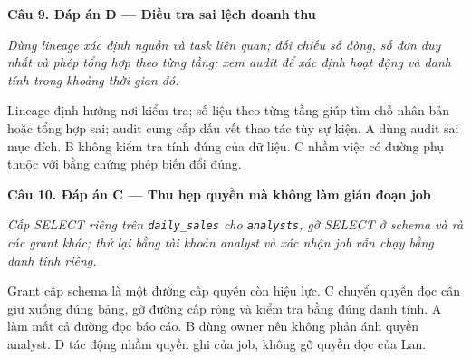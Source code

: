 \noindent\textbf{Câu 9. Đáp án D --- Điều tra sai lệch doanh thu}\par
\noindent\emph{Dùng lineage xác định nguồn và task liên quan; đối chiếu số dòng, số đơn duy nhất và phép tổng hợp theo từng tầng; xem audit để xác định hoạt động và danh tính trong khoảng thời gian đó.}\par
Lineage định hướng nơi kiểm tra; số liệu theo từng tầng giúp tìm chỗ nhân bản hoặc tổng hợp sai; audit cung cấp dấu vết thao tác tùy sự kiện. A dùng audit sai mục đích. B không kiểm tra tính đúng của dữ liệu. C nhầm việc có đường phụ thuộc với bằng chứng phép biến đổi đúng.\par\addvspace{0.8em}

\noindent\textbf{Câu 10. Đáp án C --- Thu hẹp quyền mà không làm gián đoạn job}\par
\noindent\emph{Cấp SELECT riêng trên \texttt{daily\_sales} cho \texttt{analysts}, gỡ SELECT ở schema và rà các grant khác; thử lại bằng tài khoản analyst và xác nhận job vẫn chạy bằng danh tính riêng.}\par
Grant cấp schema là một đường cấp quyền còn hiệu lực. C chuyển quyền đọc cần giữ xuống đúng bảng, gỡ đường cấp rộng và kiểm tra bằng đúng danh tính. A làm mất cả đường đọc báo cáo. B dùng owner nên không phản ánh quyền analyst. D tác động nhầm quyền ghi của job, không gỡ quyền đọc của Lan.\par\addvspace{0.8em}
